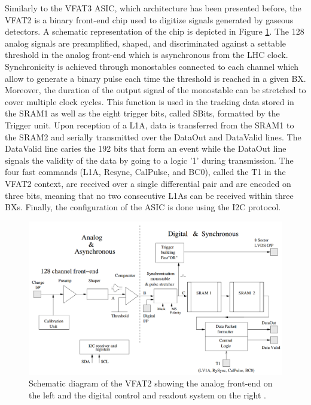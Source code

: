       Similarly to the VFAT3 ASIC, which architecture has been presented before, the VFAT2 is a binary front-end chip used to digitize signals generated by gaseous detectors. A schematic representation of the chip is depicted in Figure \ref{fig:II-2-vfat2}. The 128 analog signals are preamplified, shaped, and discriminated against a settable threshold in the analog front-end which is asynchronous from the LHC clock. Synchronicity is achieved through monostables connected to each channel which allow to generate a binary pulse each time the threshold is reached in a given BX. Moreover, the duration of the output signal of the monostable can be stretched to cover multiple clock cycles. This function is used in the tracking data stored in the SRAM1 as well as the eight trigger bits, called SBits, formatted by the Trigger unit. Upon reception of a L1A, data is transferred from the SRAM1 to the SRAM2 and serially transmitted over the DataOut and DataValid lines. The DataValid line caries the 192 bits that form an event while the DataOut line signals the validity of the data by going to a logic '1' during transmission. The four fast commands (L1A, Resync, CalPulse, and BC0), called the T1 in the VFAT2 context, are received over a single differential pair and are encoded on three bits, meaning that no two consecutive L1As can be received within three BXs. Finally, the configuration of the ASIC is done using the I2C protocol. \\

      \begin{figure}[h!]
        \centering
        \includegraphics[width=\textwidth]{img/II-2-daq/vfat2.png}
        \caption{Schematic diagram of the VFAT2 showing the analog front-end on the left and the digital control and readout system on the right \cite{Aspell:1069906}.}
        \label{fig:II-2-vfat2}
      \end{figure}

